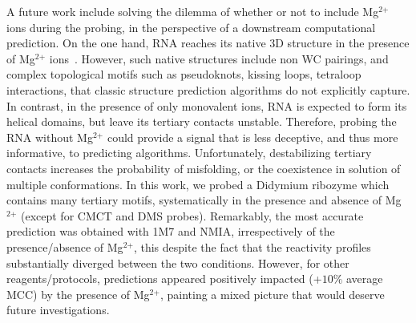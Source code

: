 \documentclass[a4,center,fleqn]{NAR}
\begin{document}
A future work include solving the dilemma of whether or not to include Mg$^{\text{2+}}$ ions during the probing, in the perspective of a downstream computational prediction. On the one hand, RNA reaches its native 3D structure in the presence of Mg$^{\text{2+}}$ ions~\cite{Knapp1989}. However, such native structures include non WC pairings, and complex topological motifs such as pseudoknots, kissing loops, tetraloop interactions, that classic structure prediction algorithms do not explicitly capture. In contrast, in the presence of only monovalent ions, RNA is expected to form its helical domains, but leave its  tertiary contacts unstable. Therefore, probing the RNA without Mg$^{\text{2+}}$ could provide a signal that is less deceptive, and thus more informative, to predicting algorithms. Unfortunately, destabilizing tertiary contacts increases the probability of misfolding, or the coexistence in solution of multiple conformations. In this work, we probed a Didymium ribozyme which contains many tertiary motifs, systematically in the presence and absence of Mg$^{\text{2+}}$ (except for CMCT and DMS probes). Remarkably, the most accurate prediction was obtained with 1M7 and NMIA, irrespectively of the presence/absence of Mg$^{\text{2+}}$, this despite the fact that the reactivity profiles substantially diverged between the two conditions. However, for other reagents/protocols, predictions appeared positively impacted (+$10\%$ average MCC) by the presence of Mg$^{\text{2+}}$, painting a mixed picture that would deserve future investigations.
\end{document}
